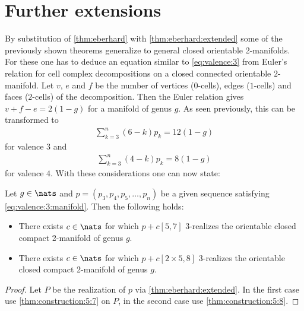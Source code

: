 \section{Further extensions}

By substitution of \autoref{thm:eberhard} with \autoref{thm:eberhard:extended} some of the previously shown theorems generalize to general closed orientable 2-manifolds. For these one has to deduce an equation similar to  \autoref{eq:valence:3} from Euler's relation for cell complex decompositions on a closed connected orientable $2$-manifold. Let $v$, $e$ and $f$ be the number of vertices ($0$-cells), edges ($1$-cells) and faces ($2$-cells) of the decomposition. Then the Euler relation gives $v + f - e = 2(1-g)$ for a manifold of genus $g$. As seen previously, this can be transformed to
\begin{align}
  \sum_{k=3}^n \left(6 - k \right) p_k = 12(1-g) \label{eq:valence:3:manifold}
\end{align}
for valence $3$ and
\begin{align}
  \sum_{k=3}^n \left(4 - k \right) p_k = 8(1-g)  \label{eq:valence:4:manifold}
\end{align}
for valence $4$. With these considerations one can now state:
\begin{theorem}
  Let $g \in \nats$ and $p = (p_3, p_4, p_5, \dots, p_n)$ be a given sequence satisfying \autoref{eq:valence:3:manifold}. Then the following holds:
  \begin{itemize}
  \item There exists $c \in \nats$ for which $p + c [5, 7]$ $3$-realizes the orientable closed compact 2-manifold of genus $g$.
  \item There exists $c \in \nats$ for which $p + c [2 \times 5, 8]$ $3$-realizes the orientable closed compact 2-manifold of genus $g$.
  \end{itemize}
  \begin{proof}
    Let $P$ be the realization of $p$ via \autoref{thm:eberhard:extended}. In the first case use \autoref{thm:construction:5:7} on $P$, in the second case use \autoref{thm:construction:5:8}.
  \end{proof}
\end{theorem}

